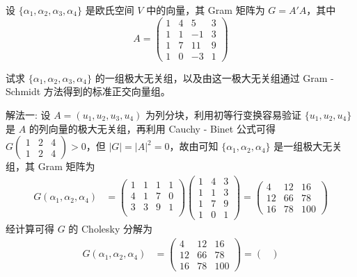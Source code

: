\documentclass[../../main.tex]{subfiles}%
\begin{document}
\begin{example}\label{example:例9.37}
设 \(\{\alpha_1,\alpha_2,\alpha_3,\alpha_4\}\) 是欧氏空间 \(V\) 中的向量，其 Gram 矩阵为 \(G = A'A\)，其中
\[
A = 
\begin{pmatrix}
1 & 4 & 5 & 3 \\
1 & 1 & -1 & 3 \\
1 & 7 & 11 & 9 \\
1 & 0 & -3 & 1
\end{pmatrix}
\]

试求 \(\{\alpha_1,\alpha_2,\alpha_3,\alpha_4\}\) 的一组极大无关组，以及由这一极大无关组通过 Gram - Schmidt 方法得到的标准正交向量组。
\end{example}
\begin{solution}

{\color{blue}解法一:}
设 \(A=(u_1,u_2,u_3,u_4)\) 为列分块，利用初等行变换容易验证 \(\{u_1,u_2,u_4\}\) 是 \(A\) 的列向量的极大无关组，再利用 Cauchy - Binet 公式可得 \(G\begin{pmatrix}1&2&4\\1&2&4\end{pmatrix}>0\)，但 \(|G| = |A|^2 = 0\)，故由可知 \(\{\alpha_1,\alpha_2,\alpha_4\}\) 是一组极大无关组，其 Gram 矩阵为
\begin{align*}
G(\alpha_1,\alpha_2,\alpha_4)&=
\left( \begin{matrix}
1&		1&		1&		1\\
4&		1&		7&		0\\
3&		3&		9&		1\\
\end{matrix} \right) 
\begin{pmatrix}
1 & 4 & 3 \\
1 & 1 & 3 \\
1 & 7 & 9 \\
1 & 0 & 1
\end{pmatrix}
=
\begin{pmatrix}
4 & 12 & 16 \\
12 & 66 & 78 \\
16 & 78 & 100
\end{pmatrix}
\end{align*}
经计算可得 \(G\) 的 Cholesky 分解为
\begin{align*}
G(\alpha_1,\alpha_2,\alpha_4)&=
\begin{pmatrix}
4 & 12 & 16 \\
12 & 66 & 78 \\
16 & 78 & 100
\end{pmatrix}
=
\begin{pmatrix}

\end{pmatrix}
\end{align*}
\end{solution}
\end{document}
